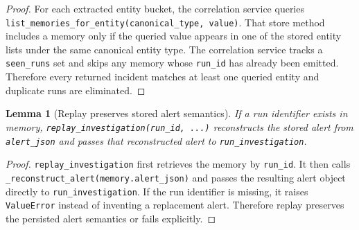 \documentclass[11pt]{article}
\newtheorem{lemma}{Lemma}
\theoremstyle{definition}
\begin{document}
\begin{proof}
For each extracted entity bucket, the correlation service queries
\texttt{list\_memories\_for\_entity(canonical\_type, value)}. That store method includes a memory
only if the queried value appears in one of the stored entity lists under the same canonical
entity type. The correlation service tracks a \texttt{seen\_runs} set and skips any memory whose
\texttt{run\_id} has already been emitted. Therefore every returned incident matches at least one
queried entity and duplicate runs are eliminated.
\end{proof}

\begin{lemma}[Replay preserves stored alert semantics]
If a run identifier exists in memory, \texttt{replay\_investigation(run\_id, ...)} reconstructs
the stored alert from \texttt{alert\_json} and passes that reconstructed alert to
\texttt{run\_investigation}.
\end{lemma}

\begin{proof}
\texttt{replay\_investigation} first retrieves the memory by \texttt{run\_id}. It then calls
\texttt{\_reconstruct\_alert(memory.alert\_json)} and passes the resulting alert object directly to
\texttt{run\_investigation}. If the run identifier is missing, it raises \texttt{ValueError}
instead of inventing a replacement alert. Therefore replay preserves the persisted alert
semantics or fails explicitly.
\end{proof}
\end{document}
